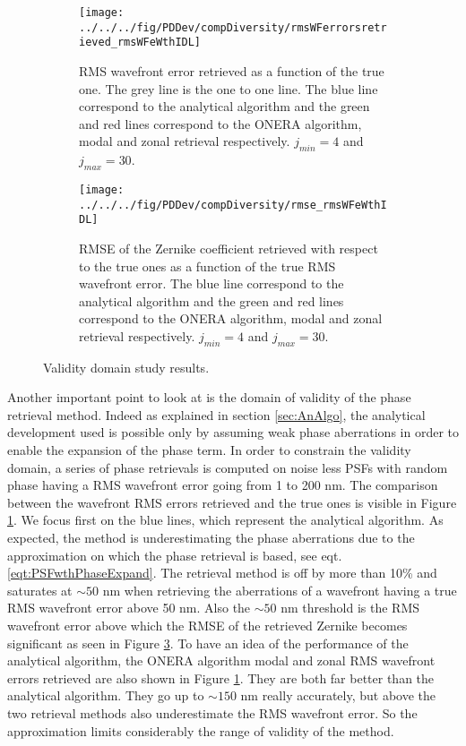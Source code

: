 \begin{figure}
\centering
    \begin{subfigure}{0.45\textwidth}
        \texttt{[image: ../../../fig/PDDev/compDiversity/rmsWFerrorsretrieved\_rmsWFeWthIDL]}
        \caption{RMS wavefront error retrieved as a function of the true one. The grey line is the one to one line. The blue line correspond to the analytical algorithm and the green and red lines correspond to the ONERA algorithm, modal and zonal retrieval respectively. $j_{min}=4$ and $j_{max}=30$.}
        \label{subfig:rmsWFerrorsretrieved_rmsWFeWthIDL}
    \end{subfigure}
    \quad
    \begin{subfigure}{0.45\textwidth}
        \texttt{[image: ../../../fig/PDDev/compDiversity/rmse\_rmsWFeWthIDL]}
        \caption{RMSE of the Zernike coefficient retrieved with respect to the true ones as a function of the true RMS wavefront error. The blue line correspond to the analytical algorithm and the green and red lines correspond to the ONERA algorithm, modal and zonal retrieval respectively. $j_{min}=4$ and $j_{max}=30$.}
        \label{subfig:rmse_rmsWFeWthIDL}
    \end{subfigure}
    \decoRule
    \caption{Validity domain study results.}
\end{figure}

Another important point to look at is the domain of validity of the phase retrieval method. Indeed as explained in section \ref{sec:AnAlgo}, the analytical development used is possible only by assuming weak phase aberrations in order to enable the expansion of the phase term. In order to constrain the validity domain, a series of phase retrievals is computed on noise less PSFs with random phase having a RMS wavefront error going from 1 to 200 nm. The comparison between the wavefront RMS errors retrieved and the true ones is visible in Figure \ref{subfig:rmsWFerrorsretrieved_rmsWFeWthIDL}. We focus first on the blue lines, which represent the analytical algorithm. As expected, the method is underestimating the phase aberrations due to the approximation on which the phase retrieval is based, see eqt. \eqref{eqt:PSFwthPhaseExpand}. The retrieval method is off by more than 10\% and saturates at $\sim 50$ nm when retrieving the aberrations of a wavefront having a true RMS wavefront error above 50 nm. Also the $\sim50$ nm threshold is the RMS wavefront error above which the RMSE of the retrieved Zernike becomes significant as seen in Figure \ref{subfig:rmse_rmsWFeWthIDL}. To have an idea of the performance of the analytical algorithm, the ONERA algorithm modal and zonal RMS wavefront errors retrieved are also shown in Figure \ref{subfig:rmsWFerrorsretrieved_rmsWFeWthIDL}. They are both far better than the analytical algorithm. They go up to $\sim150$ nm really accurately, but above the two retrieval methods also underestimate the RMS wavefront error. So the approximation limits considerably the range of validity of the method.


